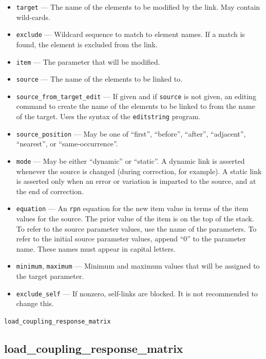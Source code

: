 \documentclass[11pt]{article}
\begin{document}
\begin{itemize}
\item \verb|target| --- The name of the elements to be modified by the link.  May contain
 wild-cards.
\item \verb|exclude| --- Wildcard sequence to match to element names.  If a match is found,
 the element is excluded from the link.
\item \verb|item| --- The parameter that will be modified.
\item \verb|source| --- The name of the elements to be linked to.
\item \verb|source_from_target_edit| --- If given and if \verb|source| is not given, 
  an editing command to create the name of the elements to be linked to from the name of the target.
  Uses the syntax of the {\tt editstring} program.
\item \verb|source_position| --- May be one of ``first'', ``before'', ``after'', 
``adjacent'', ``nearest'', or ``same-occurrence''.
\item \verb|mode| --- May be either ``dynamic'' or ``static''.  A dynamic link
is asserted whenever the source is changed (during correction, for example).  
A static link is asserted only when an error or variation is imparted to
the source, and at the end of correction.
\item \verb|equation| --- An {\tt rpn} equation for the new item value in
terms of the item values for the source.  The prior value of the item is 
on the top of the stack. To refer to the source
parameter values, use the name of the parameters. To refer to the initial source
parameter values, append ``0'' to the parameter name.  These names must appear
in capital letters.  
\item \verb|minimum|, \verb|maximum| --- Minimum and maximum values that will be
assigned to the target parameter.
\item \verb|exclude_self| --- If nonzero, self-links are blocked. It is not recommended to change this.
\end{itemize}

\newpage
\begin{center}{\Large\verb|load_coupling_response_matrix|}\end{center}
\subsection{load\_coupling\_response\_matrix \label{subsec:loadcouplingresponsematrix}}
\end{document}
